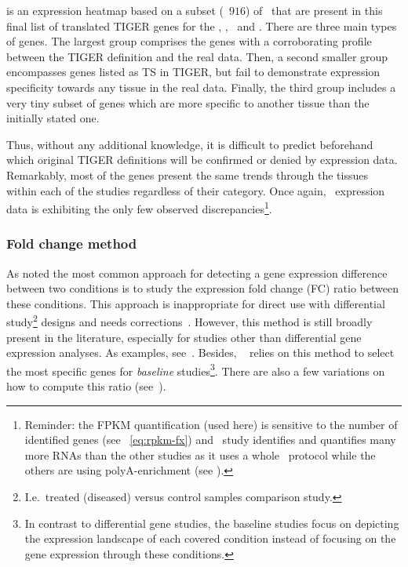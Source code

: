  is an expression heatmap based on
a subset (\ie\ $916$)  of \pcgs\
that are present in this final list of translated \gls{TIGER} genes
for the  \heart, \kidney, \liver\ and \testis.
There are three main types of genes.
The largest group comprises the genes with a corroborating profile
between the \gls{TIGER} definition and the real data.
Then, a second smaller group encompasses genes
listed as \gls{TS} in \gls{TIGER},
but fail to demonstrate expression specificity
towards any tissue in the real data.
Finally, the third group includes a very tiny subset of genes which
are more specific to another tissue than the initially stated one.

Thus, without any additional knowledge,
it is difficult to predict beforehand which original \gls{TIGER} definitions
will be confirmed or denied by expression data.
Remarkably, most of the genes present the same trends
through the tissues within each of the studies regardless of their category.
Once again, \castle\ expression data is exhibiting
the only few observed discrepancies\footnote{Reminder:
the \gls{FPKM} quantification (used here) is sensitive
to the number of identified genes (see ~\vref{eq:rpkm-fx})
and \castle\ study identifies and quantifies many more \glspl{RNA} than the
other studies as it uses a whole \RNA\ protocol
while the others are using polyA-enrichment (see ).}.

\subsubsection{Fold change method}\label{subsub:TisSpeGeneMethodPerso}
\vspace{-0.1in}
As \citet{DESeq2} noted the most common approach for detecting
a gene expression difference between two conditions is
to study the expression fold change (FC) ratio between these conditions.
This approach is inappropriate for direct use
with differential study\footnote{I.e.\ treated (diseased)
versus control samples comparison study.}
designs and
needs corrections~.
However, this method is still broadly present in the literature,
especially for studies other than differential gene expression analyses.
As examples, see~\citet{Uhlen2015,Zhu2016-xo,Yu2015-uh}.
Besides, \egxa\  relies on this method to select
the most specific genes for \emph{baseline} studies\footnote{In
contrast to differential gene studies,
the baseline studies focus on
depicting the expression landscape of each covered condition
instead of focusing on the gene expression through these conditions.}.
There are also a few variations
on how to compute this ratio (see~\citet{Zhu2016-xo,Uhlen2015}).


